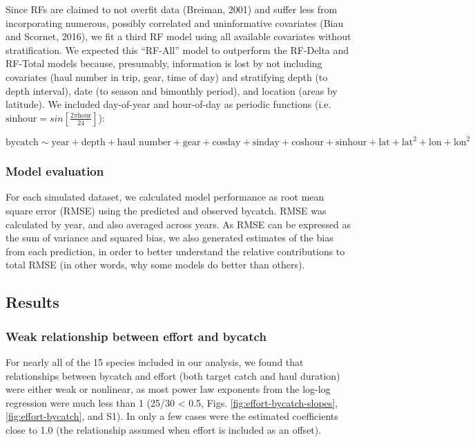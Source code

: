 \documentclass[]{article}
\begin{document}
Since RFs are claimed to not overfit data (Breiman, 2001) and suffer
less from incorporating numerous, possibly correlated and uninformative
covariates (Biau and Scornet, 2016), we fit a third RF model using all
available covariates without stratification. We expected this ``RF-All''
model to outperform the RF-Delta and RF-Total models because,
presumably, information is lost by not including covariates (haul number
in trip, gear, time of day) and stratifying depth (to depth interval),
date (to season and bimonthly period), and location (areas by latitude).
We included day-of-year and hour-of-day as periodic functions (i.e.
\(\text{sinhour} = sin \left[ \frac{2 \pi \text{hour}}{24} \right]\)):

\[ \text{bycatch} \sim \text{year} + \text{depth} + \text{haul number} + \text{gear} + \text{cosday} + \text{sinday} + \text{coshour} + \text{sinhour} + \text{lat} + \text{lat}^2 + \text{lon} + \text{lon}^2\]

\hypertarget{model-evaluation}{%
\subsubsection{Model evaluation}\label{model-evaluation}}

For each simulated dataset, we calculated model performance as root mean
square error (RMSE) using the predicted and observed bycatch. RMSE was
calculated by year, and also averaged across years. As RMSE can be
expressed as the sum of variance and squared bias, we also generated
estimates of the bias from each prediction, in order to better
understand the relative contributions to total RMSE (in other words, why
some models do better than others).

\hypertarget{results}{%
\subsection{Results}\label{results}}

\hypertarget{weak-relationship-between-effort-and-bycatch}{%
\subsubsection{Weak relationship between effort and
bycatch}\label{weak-relationship-between-effort-and-bycatch}}

For nearly all of the 15 species included in our analysis, we found that
relationships between bycatch and effort (both target catch and haul
duration) were either weak or nonlinear, as most power law exponents
from the log-log regression were much less than 1 (25/30 \textless{}
0.5, Figs. \ref{fig:effort-bycatch-slopes}, \ref{fig:effort-bycatch},
and S1). In only a few cases were the estimated coefficients close to
1.0 (the relationship assumed when effort is included as an offset).
\end{document}
